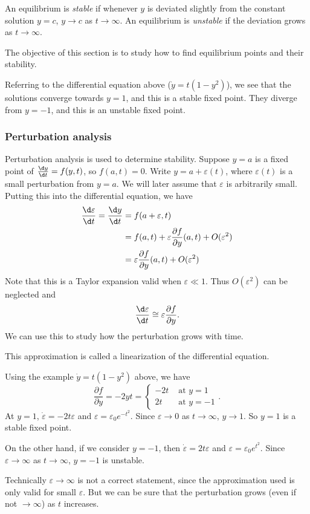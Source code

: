 \documentclass[a4paper]{article}
\begin{document}
\begin{defi}
  An equilibrium is \emph{stable} if whenever $y$ is deviated slightly from the constant solution $y = c$, $y \to c$ as $t \to \infty$. An equilibrium is \emph{unstable} if the deviation grows as $t \to \infty$.
\end{defi}

The objective of this section is to study how to find equilibrium points and their stability.
\begin{eg}
  Referring to the differential equation above ($\dot y = t (1 - y^2)$), we see that the solutions converge towards $y = 1$, and this is a stable fixed point. They diverge from $y = -1$, and this is an unstable fixed point.
\end{eg}

\subsubsection{Perturbation analysis}
Perturbation analysis is used to determine stability. Suppose $y = a$ is a fixed point of $\frac{\d y}{\d t} = f(y, t)$, so $f(a, t) = 0$. Write $y = a + \varepsilon(t)$, where $\varepsilon(t)$ is a small perturbation from $y = a$. We will later assume that $\varepsilon$ is arbitrarily small. Putting this into the differential equation, we have
\begin{align*}
  \frac{\d \varepsilon}{\d t} = \frac{\d y}{\d t} &= f(a + \varepsilon, t)\\
  &= f(a, t) + \varepsilon\frac{\partial f}{\partial y}(a, t) + O(\varepsilon^2)\\
  &= \varepsilon\frac{\partial f}{\partial y}(a, t) + O(\varepsilon^2)
\end{align*}
Note that this is a Taylor expansion valid when $\varepsilon \ll 1$. Thus $O(\varepsilon^2)$ can be neglected and
\[
  \frac{\d \varepsilon}{\d t} \cong \varepsilon\frac{\partial f}{\partial y}.
\]
We can use this to study how the perturbation grows with time.

This approximation is called a linearization of the differential equation.
\begin{eg}
  Using the example $\dot y = t(1 - y^2)$ above, we have
  \[
    \frac{\partial f}{\partial y} = -2yt =
    \begin{cases}
      -2t & \text{ at } y = 1\\
      2t & \text{ at } y = -1
    \end{cases}.
  \]
  At $y = 1$, $\dot{\varepsilon} = -2t\varepsilon$ and $\varepsilon = \varepsilon_0 e^{-t^2}$. Since $\varepsilon \to 0$ as $t \to \infty$, $y \to 1$. So $y = 1$ is a stable fixed point.

  On the other hand, if we consider $y = -1$, then $\dot\varepsilon = 2t\varepsilon$ and $\varepsilon = \varepsilon_0 e^{t^2}$. Since $\varepsilon \to \infty$ as $t\to \infty$, $y = -1$ is unstable.

  Technically $\varepsilon \to \infty$ is not a correct statement, since the approximation used is only valid for small $\varepsilon$. But we can be sure that the perturbation grows (even if not $\to \infty$) as $t$ increases.
\end{eg}
\end{document}

